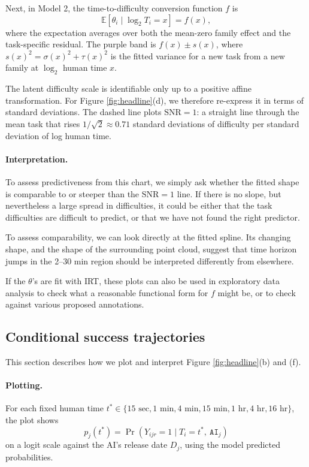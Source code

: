 \documentclass{article}
\theoremstyle{definition}
\newcommand{\AI}{\texttt{AI}}
\begin{document}
Next, in Model 2, the time-to-difficulty conversion function $f$ is 
\[
    \mathbb{E}[\theta_i \mid \log_2 T_i = x] = f(x),
\]
where the expectation averages over both the mean-zero family effect and the task-specific residual. The purple band is $f(x) \pm s(x)$, where $s(x)^2 = \sigma(x)^2 + \tau(x)^2$ is the fitted variance for a new task from a new family at $\log_2$ human time $x$. 


The latent difficulty scale is identifiable only up to a positive affine transformation. For Figure \ref{fig:headline}(d), we therefore re-express it in terms of standard deviations. The dashed line plots $\text{SNR} = 1$: a straight line through the mean task that rises $1/\sqrt{2} \approx 0.71$ standard deviations of difficulty per standard deviation of log human time. 

\paragraph{Interpretation.}
To assess predictiveness from this chart, we simply ask whether the fitted shape is comparable to or steeper than the $\text{SNR} = 1$ line. If there is no slope, but nevertheless a large spread in difficulties, it could be either that the task difficulties are difficult to predict, or that we have not found the right predictor.  

To assess comparability, we can look directly at the fitted spline. Its changing shape, and the shape of the surrounding point cloud, suggest that time horizon jumps in the 2--30 min region should be interpreted differently from elsewhere. 

If the $\theta$'s are fit with IRT, these plots can also be used in exploratory data analysis to check what a reasonable functional form for $f$ might be, or to check against various proposed annotations. 

\subsection{Conditional success trajectories}\label{sec:th-vs-success}

This section describes how we plot and interpret Figure \ref{fig:headline}(b) and (f). 

\paragraph{Plotting.} For each fixed human time $t^* \in \{15\text{ sec}, 1\text{ min}, 4\text{ min}, 15\text{ min}, 1\text{ hr}, 4\text{ hr}, 16\text{ hr}\}$, the plot shows
\[
    p_j(t^*)
    = \Pr(Y_{ijr}=1 \mid T_i=t^*,\ \AI_j)
\]
on a logit scale against the AI's release date $D_j$, using the model predicted probabilities. 
\end{document}
